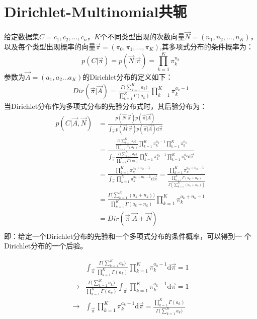 \section{Dirichlet-Multinomial共轭}
给定数据集$C={c_1,c_2,...,c_n}$，$K$个不同类型出现的次数向量$\vec{N}=(n_1,n_2,...,n_K)$，以及每个类型出现概率的向量$\vec{\pi}=(\pi_0, \pi_1,...,\pi_K)$,其多项式分布的条件概率为：
\begin{displaymath}
p(C|\vec{\pi}) =p(\vec{N}|\vec{\pi})= \prod_{k=1}^{K}\pi_k^{n_k}
\end{displaymath}
参数为$\vec{A} = (a_1,a_2...a_K)$的Dirichlet分布的定义如下：
\begin{displaymath}
\begin{split}
Dir(\vec{\pi}|\vec{A})=\frac{\Gamma{(\sum_{k=1}^{K}{a_k}})}{\prod_{k=1}^{K}{\Gamma{(a_k)}}}\prod_{k=1}^{K}{\pi_{k}^{a_k-1}}
\end{split}
\end{displaymath}
当Dirichlet分布作为多项式分布的先验分布式时，其后验分布为：
\begin{displaymath}
\begin{split}
p(C|\vec{A},\vec{N})
&= \frac{p(\vec{N}|\vec{\pi}) p(\vec{\pi}|\vec{A})}{\int_{\vec{\pi}} p(\vec{M}|\vec{\pi}) p(\vec{\pi}|\vec{A})  \mathrm{d} \vec{\pi}}\\
&= \frac{
\frac{\Gamma{(\sum_{k=1}^{K}{a_k}})}{\prod_{k=1}^{K}{\Gamma{(a_k)}}}\prod_{k=1}^{K}{\pi_{k}^{a_k-1}} \prod_{k=1}^{K}\pi_k^{n_k} 
}{ \int_{\vec{\pi}}
\frac{\Gamma{(\sum_{k=1}^{K}{a_k}})}{\prod_{k=1}^{K}{\Gamma{(a_k)}}}\prod_{k=1}^{K}{\pi_{k}^{a_k-1}} \prod_{k=1}^{K}\pi_k^{n_k}   \mathrm{d} \vec{\pi}
}\\
&= \frac{
\prod_{k=1}^{K}{\pi_{k}^{a_k+n_k-1}}
}{ \int_{\vec{\pi}}
\prod_{k=1}^{K}{\pi_{k}^{a_k+n_k-1}}   \mathrm{d} \vec{\pi}
}
= \frac{
\prod_{k=1}^{K}{\pi_{k}^{a_k+n_k-1}}
}{ 
\frac{\prod_{k=1}^{K} \Gamma(a_k+n_k)}{\Gamma(\sum_{k=1}^K(a_k+n_k))}
}\\
&= \frac{\Gamma{(\sum_{k=1}^{K}{(a_k+n_k)}})}{\prod_{k=1}^{K}{\Gamma{(a_k+n_k)}}}\prod_{k=1}^{K}{\pi_{k}^{a_k+n_k-1}}\\
&= Dir(\vec{\pi}|\vec{A}+\vec{N})\\
\end{split}
\end{displaymath}
即：给定一个Dirichlet分布的先验和一个多项式分布的条件概率，可以得到一
个Dirichlet分布的一个后验。

\begin{displaymath}
\begin{split}
&\int_{\vec{\pi}} \frac{\Gamma{(\sum_{k=1}^{K}{a_k}})}{\prod_{k=1}^{K}{\Gamma{(a_k)}}}  \prod_{k=1}^{K}{\pi_{k}^{a_k-1}}   \mathrm{d} \vec{\pi} =1 \\
\to & \frac{\Gamma{(\sum_{k=1}^{K}{a_k}})}{\prod_{k=1}^{K}{\Gamma{(a_k)}}} \int_{\vec{\pi}}  \prod_{k=1}^{K}{\pi_{k}^{a_k-1}}   \mathrm{d} \vec{\pi} =1 \\
\to &  \int_{\vec{\pi}}  \prod_{k=1}^{K}{\pi_{k}^{a_k-1}}   \mathrm{d} \vec{\pi} =  \frac{\prod_{k=1}^{K}{\Gamma{(a_k)}}}  {\Gamma{(\sum_{k=1}^{K}{a_k}})}\\
\end{split}
\end{displaymath}


